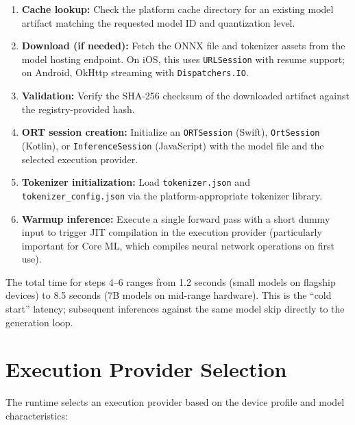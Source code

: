 \documentclass[12pt, letterpaper, twoside]{report}
\begin{document}
\begin{enumerate}[itemsep=3pt]
\item \textbf{Cache lookup:} Check the platform cache directory for an existing model artifact matching the requested model ID and quantization level.
\item \textbf{Download (if needed):} Fetch the ONNX file and tokenizer assets from the model hosting endpoint. On iOS, this uses \texttt{URLSession} with resume support; on Android, OkHttp streaming with \texttt{Dispatchers.IO}.
\item \textbf{Validation:} Verify the SHA-256 checksum of the downloaded artifact against the registry-provided hash.
\item \textbf{ORT session creation:} Initialize an \texttt{ORTSession} (Swift), \texttt{OrtSession} (Kotlin), or \texttt{Inference\-Session} (JavaScript) with the model file and the selected execution provider.
\item \textbf{Tokenizer initialization:} Load \texttt{tokenizer.json} and \texttt{tokenizer\_config.json} via the platform-appropriate tokenizer library.
\item \textbf{Warmup inference:} Execute a single forward pass with a short dummy input to trigger JIT compilation in the execution provider (particularly important for Core ML, which compiles neural network operations on first use).
\end{enumerate}

The total time for steps 4--6 ranges from 1.2 seconds (small models on flagship devices) to 8.5 seconds (7B models on mid-range hardware). This is the ``cold start'' latency; subsequent inferences against the same model skip directly to the generation loop.

\section{Execution Provider Selection}
\label{sec:ep_selection}

The runtime selects an execution provider based on the device profile and model characteristics:
\end{document}
